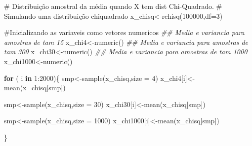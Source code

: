 \documentclass[
  letterpaper,
  DIV=11,
  numbers=noendperiod]{scrartcl}
\newenvironment{Shaded}{\begin{snugshade}}{\end{snugshade}}
\newcommand{\AttributeTok}[1]{\textcolor[rgb]{0.40,0.45,0.13}{#1}}
\newcommand{\CommentTok}[1]{\textcolor[rgb]{0.37,0.37,0.37}{#1}}
\newcommand{\ControlFlowTok}[1]{\textcolor[rgb]{0.00,0.23,0.31}{\textbf{#1}}}
\newcommand{\DecValTok}[1]{\textcolor[rgb]{0.68,0.00,0.00}{#1}}
\newcommand{\DocumentationTok}[1]{\textcolor[rgb]{0.37,0.37,0.37}{\textit{#1}}}
\newcommand{\FunctionTok}[1]{\textcolor[rgb]{0.28,0.35,0.67}{#1}}
\newcommand{\NormalTok}[1]{\textcolor[rgb]{0.00,0.23,0.31}{#1}}
\newcommand{\OtherTok}[1]{\textcolor[rgb]{0.00,0.23,0.31}{#1}}
\newcommand{\SpecialCharTok}[1]{\textcolor[rgb]{0.37,0.37,0.37}{#1}}
\begin{document}
\begin{Shaded}
\begin{Highlighting}[]
\CommentTok{\# Distribuição amostral da média quando X tem dist Chi{-}Quadrado. }
\CommentTok{\# Simulando uma distribuição chiquadrado}
\NormalTok{x\_chisq}\OtherTok{\textless{}{-}}\FunctionTok{rchisq}\NormalTok{(}\DecValTok{100000}\NormalTok{,}\AttributeTok{df=}\DecValTok{3}\NormalTok{)}

\CommentTok{\#Inicializando as variaveis como vetores numericos}
\DocumentationTok{\#\# Media e variancia para amostras de tam 15}
\NormalTok{x\_chi4}\OtherTok{\textless{}{-}}\FunctionTok{numeric}\NormalTok{()}
\DocumentationTok{\#\# Media e variancia para amostras de tam 300}
\NormalTok{x\_chi30}\OtherTok{\textless{}{-}}\FunctionTok{numeric}\NormalTok{()}
\DocumentationTok{\#\# Media e variancia para amostras de tam 1000}
\NormalTok{x\_chi1000}\OtherTok{\textless{}{-}}\FunctionTok{numeric}\NormalTok{()}

\ControlFlowTok{for}\NormalTok{ ( i }\ControlFlowTok{in} \DecValTok{1}\SpecialCharTok{:}\DecValTok{2000}\NormalTok{)\{}
\NormalTok{  smp}\OtherTok{\textless{}{-}}\FunctionTok{sample}\NormalTok{(x\_chisq,}\AttributeTok{size =} \DecValTok{4}\NormalTok{)}
\NormalTok{  x\_chi4[i]}\OtherTok{\textless{}{-}}\FunctionTok{mean}\NormalTok{(x\_chisq[smp])}
  
\NormalTok{  smp}\OtherTok{\textless{}{-}}\FunctionTok{sample}\NormalTok{(x\_chisq,}\AttributeTok{size =} \DecValTok{30}\NormalTok{)}
\NormalTok{  x\_chi30[i]}\OtherTok{\textless{}{-}}\FunctionTok{mean}\NormalTok{(x\_chisq[smp])}

\NormalTok{  smp}\OtherTok{\textless{}{-}}\FunctionTok{sample}\NormalTok{(x\_chisq,}\AttributeTok{size =} \DecValTok{1000}\NormalTok{)}
\NormalTok{  x\_chi1000[i]}\OtherTok{\textless{}{-}}\FunctionTok{mean}\NormalTok{(x\_chisq[smp])}

\NormalTok{\}}


\end{Highlighting}
\end{Shaded}
\end{document}
